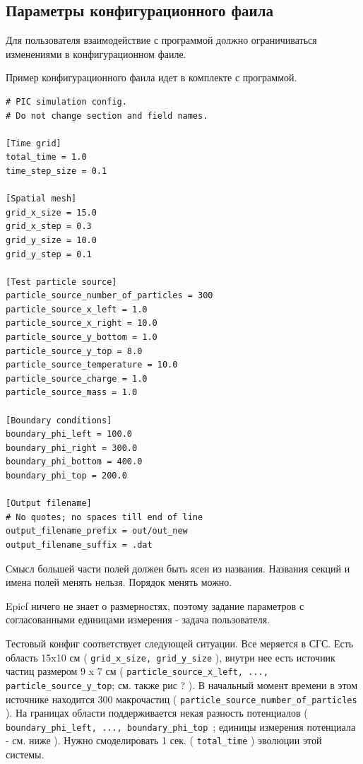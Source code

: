 \subsection{ Параметры конфигурационного фаила }
\label{sec:config_file}

Для пользователя взаимодействие с программой должно ограничиваться изменениями в конфигурационном фаиле.

Пример конфигурационного фаила идет в комплекте с программой.
\begin{verbatim}
# PIC simulation config.
# Do not change section and field names.

[Time grid]
total_time = 1.0
time_step_size = 0.1

[Spatial mesh]
grid_x_size = 15.0
grid_x_step = 0.3
grid_y_size = 10.0
grid_y_step = 0.1

[Test particle source]
particle_source_number_of_particles = 300
particle_source_x_left = 1.0
particle_source_x_right = 10.0
particle_source_y_bottom = 1.0
particle_source_y_top = 8.0
particle_source_temperature = 10.0
particle_source_charge = 1.0
particle_source_mass = 1.0

[Boundary conditions]
boundary_phi_left = 100.0
boundary_phi_right = 300.0
boundary_phi_bottom = 400.0
boundary_phi_top = 200.0

[Output filename]
# No quotes; no spaces till end of line
output_filename_prefix = out/out_new
output_filename_suffix = .dat
\end{verbatim}
Смысл большей части полей должен быть ясен из названия.
Названия секций и имена полей менять нельзя. 
Порядок менять можно.

Epicf ничего не знает о размерностях, поэтому задание параметров с согласованными единицами измерения - задача пользователя.

Тестовый конфиг соответствует следующей ситуации. Все меряется в СГС.
Есть область 15x10 см ( \texttt{grid\_x\_size, grid\_y\_size} ), внутри нее есть источник частиц размером 9 x 7 см 
( \texttt{particle\_source\_x\_left, ..., particle\_source\_y\_top}; см. также рис ? ).
В начальный момент времени в этом источнике находится 300 макрочастиц ( \texttt{particle\_source\_number\_of\_particles} ).
На границах области поддерживается некая разность потенциалов 
( \texttt{ boundary\_phi\_left, ..., boundary\_phi\_top }; единицы измерения потенциала - см. ниже ). 
Нужно смоделировать 1 сек. ( \texttt{total\_time} ) эволюции этой системы.

